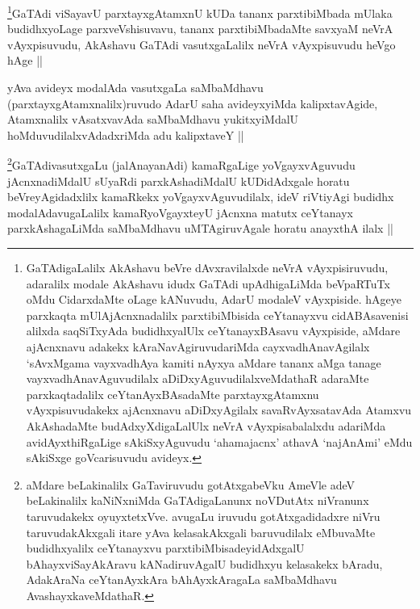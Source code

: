 \begin{artha}
\footnote{GaTAdigaLalilx AkAshavu beVre dAvxravilalxde neVrA vAyxpisiruvudu, adaralilx modale AkAshavu idudx GaTAdi upAdhigaLiMda beVpaRTuTx oMdu CidarxdaMte oLage kANuvudu, AdarU modaleV vAyxpiside. hAgeye parxkaqta mUlAjAcnxnadalilx parxtibiMbisida ceYtanayxvu cidABAsavenisi alilxda saqSiTxyAda budidhxyalUlx ceYtanayxBAsavu vAyxpiside, aMdare ajAcnxnavu adakekx kAraNavAgiruvudariMda cayxvadhAnavAgilalx `sAvxMgama vayxvadhAya kamiti nAyxya aMdare tananx aMga tanage vayxvadhAnavAguvudilalx aDiDxyAguvudilalxveMdathaR adaraMte parxkaqtadalilx ceYtanAyxBAsadaMte parxtayxgAtamxnu vAyxpisuvudakekx ajAcnxnavu aDiDxyAgilalx savaRvAyxsatavAda Atamxvu AkAshadaMte budAdxyXdigaLalUlx neVrA vAyxpisabalalxdu adariMda avidAyxthiRgaLige sAkiSxyAguvudu `ahamajacnx' athavA `najAnAmi' eMdu sAkiSxge goVcarisuvudu avideyx.}GaTAdi viSayavU parxtayxgAtamxnU kUDa tananx parxtibiMbada mUlaka budidhxyoLage parxveVshisuvavu, tananx parxtibiMbadaMte savxyaM neVrA vAyxpisuvudu, AkAshavu GaTAdi vasutxgaLalilx neVrA vAyxpisuvudu heVgo hAge ||
\end{artha}

\begin{artha}
yAva avideyx modalAda vasutxgaLa saMbaMdhavu (parxtayxgAtamxnalilx)ruvudo AdarU saha avideyxyiMda kalipxtavAgide, Atamxnalilx vAsatxvavAda saMbaMdhavu yukitxyiMdalU hoMduvudilalxvAdadxriMda adu kalipxtaveY ||
\end{artha}

\begin{artha}
\footnote{aMdare beLakinalilx GaTaviruvudu gotAtxgabeVku AmeVle adeV beLakinalilx kaNiNxniMda GaTAdigaLanunx noVDutAtx niVranunx taruvudakekx oyuyxtetxVve. avugaLu iruvudu gotAtxgadidadxre niVru taruvudakAkxgali itare yAva kelasakAkxgali baruvudilalx eMbuvaMte budidhxyalilx ceYtanayxvu parxtibiMbisadeyidAdxgalU bAhayxviSayAkAravu kANadiruvAgalU budidhxyu kelasakekx bAradu, AdakAraNa ceYtanAyxkAra bAhAyxkAragaLa saMbaMdhavu AvashayxkaveMdathaR.}GaTAdivasutxgaLu (jalAnayanAdi) kamaRgaLige yoVgayxvAguvudu jAcnxnadiMdalU sUyaRdi parxkAshadiMdalU kUDidAdxgale horatu beVreyAgidadxlilx kamaRkekx yoVgayxvAguvudilalx, ideV riVtiyAgi budidhx modalAdavugaLalilx kamaRyoVgayxteyU jAcnxna matutx ceYtanayx parxkAshagaLiMda saMbaMdhavu uMTAgiruvAgale horatu anayxthA ilalx ||
\end{artha}

